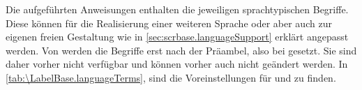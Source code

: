 \begin{Declaration}
\end{Declaration}
Die aufgeführten Anweisungen enthalten die jeweiligen sprachtypischen
Begriffe. Diese können für die Realisierung einer
weiteren Sprache oder aber auch zur eigenen freien Gestaltung wie in
\autoref{sec:scrbase.languageSupport} erklärt angepasst werden. Von
\KOMAScript{} werden die Begriffe erst nach der Präambel, also bei
 gesetzt. Sie sind daher vorher nicht
verfügbar und können vorher auch nicht geändert werden. In
\autoref{tab:\LabelBase.languageTerms},
 sind die Voreinstellungen
für  und  zu finden.%
\EndIndexGroup

